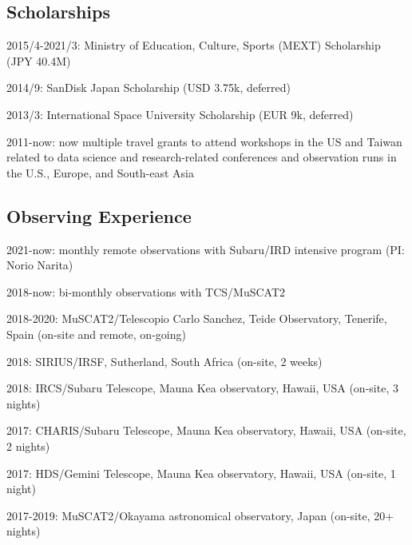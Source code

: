 \documentclass[12pt,letterpaper]{article}
\begin{document}
\fi

\subsection{Scholarships}
\begin{list}{}{\cvlist}
    \item 2015/4-2021/3: Ministry of Education, Culture, Sports (MEXT) Scholarship (JPY 40.4M)
    \item 2014/9: SanDisk Japan Scholarship (USD 3.75k, deferred)
    \item 2013/3: International Space University Scholarship (EUR 9k, deferred)
    \item 2011-now: now multiple travel grants to attend workshops in the US and Taiwan related to data science and research-related conferences and observation runs in the U.S., Europe, and South-east Asia
\end{list}

\subsection{Observing Experience}
\begin{list}{}{\cvlist}
    \item 2021-now: monthly remote observations with Subaru/IRD intensive program (PI: Norio Narita) 
    \item 2018-now: bi-monthly observations with TCS/MuSCAT2
    \item 2018-2020: MuSCAT2/Telescopio Carlo Sanchez, Teide Observatory, Tenerife, Spain (on-site and remote, on-going)
    \item 2018: SIRIUS/IRSF, Sutherland, South Africa (on-site, 2 weeks)
    \item 2018: IRCS/Subaru Telescope, Mauna Kea observatory, Hawaii, USA (on-site, 3 nights)
    \item 2017: CHARIS/Subaru Telescope, Mauna Kea observatory, Hawaii, USA (on-site, 2 nights)
    \item 2017: HDS/Gemini Telescope, Mauna Kea observatory, Hawaii, USA (on-site, 1 night)
    \item 2017-2019: MuSCAT2/Okayama astronomical observatory, Japan (on-site, 20+ nights)
\end{list}
\end{document}

